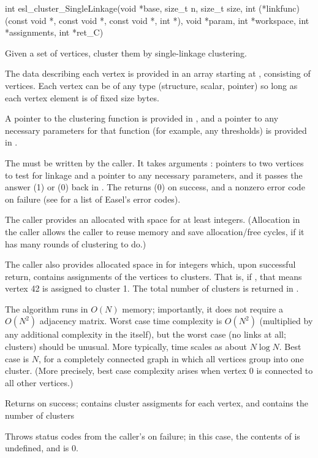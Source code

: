 \begin{sreapi}
\hypertarget{func:esl_cluster_SingleLinkage()}
{\item[int esl\_cluster\_SingleLinkage(void *base, size\_t n, size\_t size, 
			  int (*linkfunc)(const void *, const void *, const void *, int *), void *param,
			  int *workspace, int *assignments, int *ret\_C)]}

Given a set of vertices, cluster them by single-linkage
clustering.

The data describing each vertex is provided in an array
starting at , consisting of  vertices. Each
vertex can be of any type (structure, scalar, pointer)
so long as each vertex element is of fixed size 
bytes.

A pointer to the clustering function is provided in
, and a pointer to any necessary
parameters for that function (for example, any
thresholds) is provided in . 

The  must be written by the
caller. It takes arguments : pointers to two vertices to
test for linkage and a pointer to any necessary
parameters, and it passes the answer  (1) or
 (0) back in . The 
returns  (0) on success, and a nonzero error code
on failure (see  for a list of Easel's error
codes).

The caller provides an allocated  with space
for at least  integers. (Allocation in the caller
allows the caller to reuse memory and save
allocation/free cycles, if it has many rounds of
clustering to do.)

The caller also provides allocated space in
 for  integers which, upon successful
return, contains assignments of the  vertices to
 clusters. That is, if ,
that means vertex 42 is assigned to cluster 1.  The
total number of clusters is returned in .

The algorithm runs in $O(N)$ memory; importantly, it
does not require a $O(N^2)$ adjacency matrix. Worst case
time complexity is $O(N^2)$ (multiplied by any
additional complexity in the  itself), but
the worst case (no links at all;  clusters) should
be unusual. More typically, time scales as about $N \log
N$. Best case is $N$, for a completely connected graph
in which all vertices group into one cluster. (More
precisely, best case complexity arises when vertex 0 is
connected to all other  vertices.)

Returns  on success;  contains cluster assigments 
 for each vertex, and  contains the number of clusters

Throws status codes from the caller's  on failure; in this case, 
the contents of  is undefined, and  is 0.


\end{sreapi}

